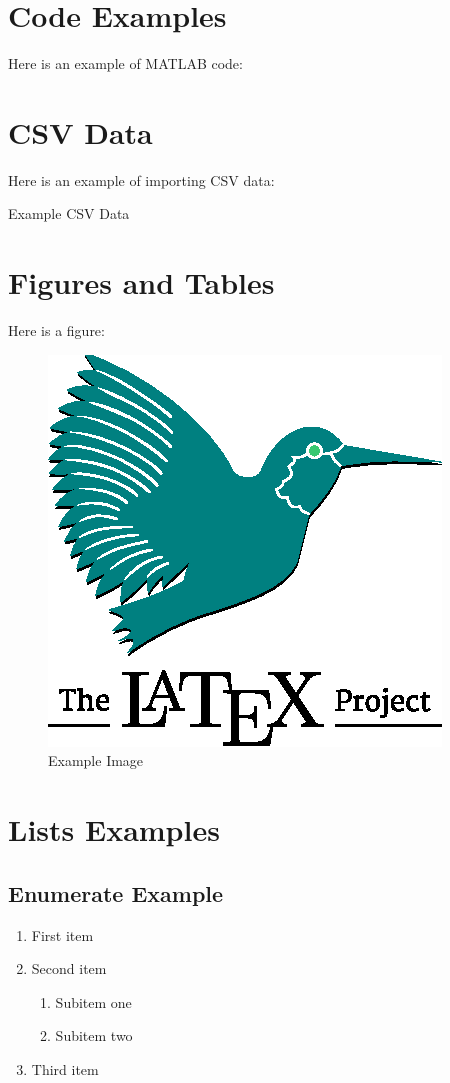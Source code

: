 \documentclass[ensem,french]{myreport}
\begin{document}
\chapter{Code Examples}
Here is an example of MATLAB code:


\chapter{CSV Data}
Here is an example of importing CSV data:
\begin{table}
    \centering
    \caption{Example CSV Data}
\end{table}

\chapter{Figures and Tables}
Here is a figure:
\begin{figure}[H]
    \centering
    \includegraphics{template/example.eps}
    \caption{Example Image}
    \label{fig:example}
\end{figure}

\chapter{Lists Examples}

\section{Enumerate Example}
\begin{enumerate}
    \item First item
    \item Second item
    \begin{enumerate}
        \item Subitem one
        \item Subitem two
    \end{enumerate}
    \item Third item
\end{enumerate}
\end{document}
